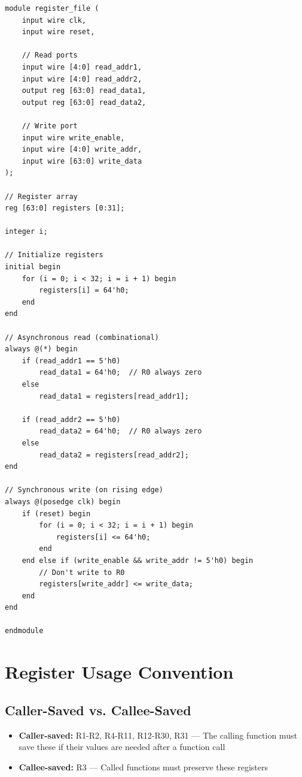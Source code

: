 \documentclass[12pt,a4paper,oneside]{book}
\begin{document}
\begin{lstlisting}[style=verilog, caption={Register File Implementation}, label={lst:regfile}]
module register_file (
    input wire clk,
    input wire reset,
    
    // Read ports
    input wire [4:0] read_addr1,
    input wire [4:0] read_addr2,
    output reg [63:0] read_data1,
    output reg [63:0] read_data2,
    
    // Write port
    input wire write_enable,
    input wire [4:0] write_addr,
    input wire [63:0] write_data
);

// Register array
reg [63:0] registers [0:31];

integer i;

// Initialize registers
initial begin
    for (i = 0; i < 32; i = i + 1) begin
        registers[i] = 64'h0;
    end
end

// Asynchronous read (combinational)
always @(*) begin
    if (read_addr1 == 5'h0)
        read_data1 = 64'h0;  // R0 always zero
    else
        read_data1 = registers[read_addr1];
    
    if (read_addr2 == 5'h0)
        read_data2 = 64'h0;  // R0 always zero
    else
        read_data2 = registers[read_addr2];
end

// Synchronous write (on rising edge)
always @(posedge clk) begin
    if (reset) begin
        for (i = 0; i < 32; i = i + 1) begin
            registers[i] <= 64'h0;
        end
    end else if (write_enable && write_addr != 5'h0) begin
        // Don't write to R0
        registers[write_addr] <= write_data;
    end
end

endmodule
\end{lstlisting}

\section{Register Usage Convention}

\subsection{Caller-Saved vs. Callee-Saved}

\begin{itemize}
    \item \textbf{Caller-saved:} R1-R2, R4-R11, R12-R30, R31 --- The calling function must save these if their values are needed after a function call
    \item \textbf{Callee-saved:} R3 --- Called functions must preserve these registers
\end{itemize}
\end{document}
